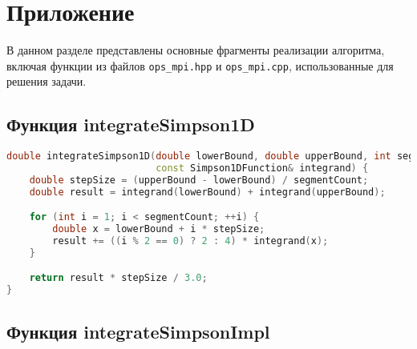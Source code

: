 \documentclass[12pt]{article}
\begin{document}
\appendix
\section*{Приложение}

В данном разделе представлены основные фрагменты реализации алгоритма, включая функции из файлов \texttt{ops\_mpi.hpp} и \texttt{ops\_mpi.cpp}, использованные для решения задачи.

\subsection*{Функция integrateSimpson1D}

\begin{lstlisting}[language=C++]
double integrateSimpson1D(double lowerBound, double upperBound, int segmentCount,
                          const Simpson1DFunction& integrand) {
    double stepSize = (upperBound - lowerBound) / segmentCount;
    double result = integrand(lowerBound) + integrand(upperBound);

    for (int i = 1; i < segmentCount; ++i) {
        double x = lowerBound + i * stepSize;
        result += ((i % 2 == 0) ? 2 : 4) * integrand(x);
    }

    return result * stepSize / 3.0;
}
\end{lstlisting}

\subsection*{Функция integrateSimpsonImpl}
\end{document}
